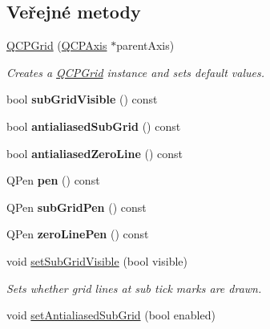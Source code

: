\subsection*{Veřejné metody}
\begin{DoxyCompactItemize}
\item 
\hyperlink{classQCPGrid_acd1cdd2909625388a13048b698494a17}{Q\+C\+P\+Grid} (\hyperlink{classQCPAxis}{Q\+C\+P\+Axis} $\ast$parent\+Axis)
\begin{DoxyCompactList}\small\item\em Creates a \hyperlink{classQCPGrid}{Q\+C\+P\+Grid} instance and sets default values. \end{DoxyCompactList}\item 
\hypertarget{classQCPGrid_a0a8963e384d53cd77cbab7df96147458}{}bool {\bfseries sub\+Grid\+Visible} () const \label{classQCPGrid_a0a8963e384d53cd77cbab7df96147458}

\item 
\hypertarget{classQCPGrid_abfa6c638a05b45b2ed31b680fc9b31fc}{}bool {\bfseries antialiased\+Sub\+Grid} () const \label{classQCPGrid_abfa6c638a05b45b2ed31b680fc9b31fc}

\item 
\hypertarget{classQCPGrid_a4dfbc1cee989d8cae1434b765ab2a13b}{}bool {\bfseries antialiased\+Zero\+Line} () const \label{classQCPGrid_a4dfbc1cee989d8cae1434b765ab2a13b}

\item 
\hypertarget{classQCPGrid_aca20b67548e3ae31fd02e6398ffd6cb9}{}Q\+Pen {\bfseries pen} () const \label{classQCPGrid_aca20b67548e3ae31fd02e6398ffd6cb9}

\item 
\hypertarget{classQCPGrid_ac698f8c6864b1d8f0e2af97ca4b39cc6}{}Q\+Pen {\bfseries sub\+Grid\+Pen} () const \label{classQCPGrid_ac698f8c6864b1d8f0e2af97ca4b39cc6}

\item 
\hypertarget{classQCPGrid_a06ea986b651860446e1224d2097259b9}{}Q\+Pen {\bfseries zero\+Line\+Pen} () const \label{classQCPGrid_a06ea986b651860446e1224d2097259b9}

\item 
void \hyperlink{classQCPGrid_ad4ad6bf714ec45e08845456355a1b700}{set\+Sub\+Grid\+Visible} (bool visible)
\begin{DoxyCompactList}\small\item\em Sets whether grid lines at sub tick marks are drawn. \end{DoxyCompactList}\item 
\hypertarget{classQCPGrid_a5692310ba183721a413d60951407d114}{}void \hyperlink{classQCPGrid_a5692310ba183721a413d60951407d114}{set\+Antialiased\+Sub\+Grid} (bool enabled)\label{classQCPGrid_a5692310ba183721a413d60951407d114}


\end{DoxyCompactItemize}
